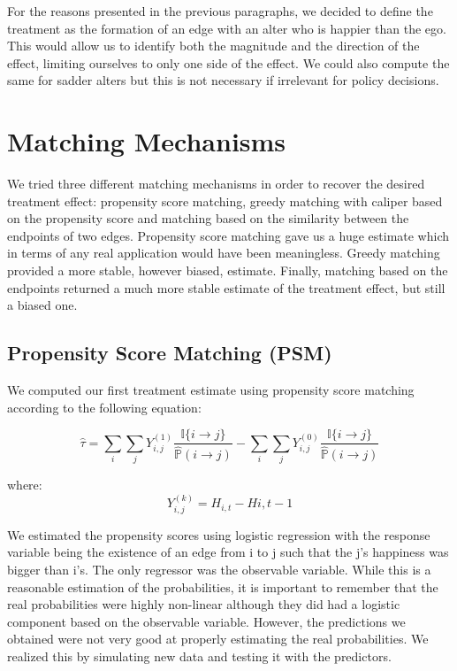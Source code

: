 \documentclass[11pt]{article}
\begin{document}
For the reasons presented in the previous paragraphs, we decided to define the treatment as the formation of an edge with an alter who is happier than the ego. This would allow us to identify both the magnitude and the direction of the effect, limiting ourselves to only one side of the effect. We could also compute the same for sadder alters but this is not necessary if irrelevant for policy decisions. 

\section{Matching Mechanisms} \label{Matching Mechanisms}
We tried three different matching mechanisms in order to recover the desired treatment effect: propensity score matching, greedy matching with caliper based on the propensity score and matching based on the similarity between the endpoints of two edges. Propensity score matching gave us a huge estimate which in terms of any real application would have been meaningless. Greedy matching provided a more stable, however biased, estimate. Finally, matching based on the endpoints returned a much more stable estimate of the treatment effect, but still a biased one. 

\subsection{Propensity Score Matching (PSM)}

We computed our first treatment estimate using propensity score matching according to the following equation:

$$\hat{\tau} = \sum\limits_i\sum\limits_j Y_{i,j}^{(1)}\frac{\mathbb{I}\{i \rightarrow j\}}{\hat{\mathbb{P}}(i\rightarrow j)} - \sum\limits_i\sum\limits_j Y_{i,j}^{(0)}\frac{\mathbb{I}\{i \rightarrow j\}}{\hat{\mathbb{P}}(i\rightarrow j)}$$

where:
$$Y_{i,j}^(k) = H_{i,t}-H{i,t-1}$$

We estimated the propensity scores using logistic regression with the response variable being the existence of an edge from i to j such that the j's happiness was bigger than i's. The only regressor was the observable variable. While this is a reasonable estimation of the probabilities, it is important to remember that the real probabilities were highly non-linear although they did had a logistic component based on the observable variable. However, the predictions we obtained were not very good at properly estimating the real probabilities. We realized this by simulating new data and testing it with the predictors. 
\end{document}
